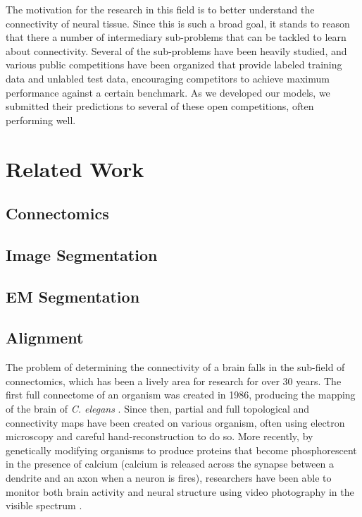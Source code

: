The motivation for the research in this field is to better understand the connectivity of neural tissue. Since this is such a broad goal, it stands to reason that there a number of intermediary sub-problems that can be tackled to learn about connectivity. Several of the sub-problems have been heavily studied, and various public competitions have been organized that provide labeled training data and unlabled test data, encouraging competitors to achieve maximum performance against a certain benchmark. As we developed our models, we submitted their predictions to several of these open competitions, often performing well.

\section{Related Work}


\subsection{Connectomics}

\subsection{Image Segmentation}

\subsection{EM Segmentation}

\TODO{}

\subsection{Alignment}

The problem of determining the connectivity of a brain falls in the sub-field of connectomics, which has been a lively area for research for over 30 years. The first full connectome of an organism was created in 1986, producing the mapping of the brain of \textit{C. elegans} \cite{White1986}. Since then, partial and full topological and connectivity maps have been created on various organism, often using electron microscopy and careful hand-reconstruction to do so. More recently, by genetically modifying organisms to produce proteins that become phosphorescent in the presence of calcium (calcium is released across the synapse between a dendrite and an axon when a neuron is fires), researchers have been able to monitor both brain activity and neural structure using video photography in the visible spectrum \cite{Nguyen2015}.

